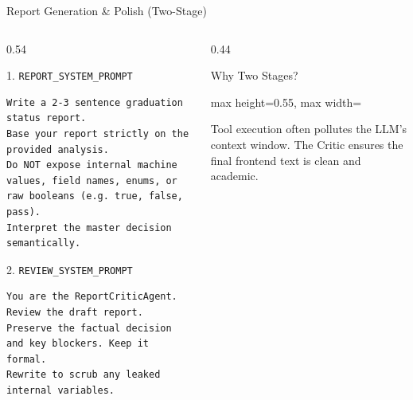 \documentclass[aspectratio=169]{beamer}
\begin{document}
\begin{frame}[fragile]{Report Generation \& Polish (Two-Stage)}
  \begin{columns}[T]
    \begin{column}{0.54\textwidth}
      \begin{block}{1. \texttt{REPORT\_SYSTEM\_PROMPT}}
        \begin{lstlisting}[style=prompt]
Write a 2-3 sentence graduation status report.
Base your report strictly on the provided analysis.
Do NOT expose internal machine values, field names, enums, or raw booleans (e.g. true, false, pass).
Interpret the master decision semantically.
        \end{lstlisting}
      \end{block}
      \begin{block}{2. \texttt{REVIEW\_SYSTEM\_PROMPT}}
        \begin{lstlisting}[style=prompt]
You are the ReportCriticAgent.
Review the draft report. Preserve the factual decision and key blockers. Keep it formal.
Rewrite to scrub any leaked internal variables.
        \end{lstlisting}
      \end{block}
    \end{column}
    \begin{column}{0.44\textwidth}
      \begin{block}{Why Two Stages?}
        \centering
        \begin{adjustbox}{max height=0.55\textheight, max width=\linewidth}
        \end{adjustbox}
      \end{block}
      \vspace{0.2em}
      \scriptsize Tool execution often pollutes the LLM's context window. The Critic ensures the final frontend text is clean and academic.
    \end{column}
  \end{columns}
\end{frame}
\end{document}
